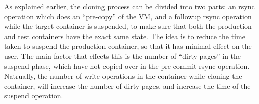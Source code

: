 As explained earlier, the cloning process can be divided into two parts: an rsync operation which does an ``pre-copy'' of the VM, and a followup rsync operation while the target container is suspended, to make sure that both the production and test containers have the exact same state.
The idea is to reduce the time taken to suspend the production container, so that it has minimal effect on the user.
The main factor that effects this is the number of ``dirty pages'' in the suspend phase, which have not copied over in the pre-commit rsync operation.
Natrually, the number of write operations in the container while cloning the container, will increase the number of dirty pages, and increase the time of the suspend operation.


